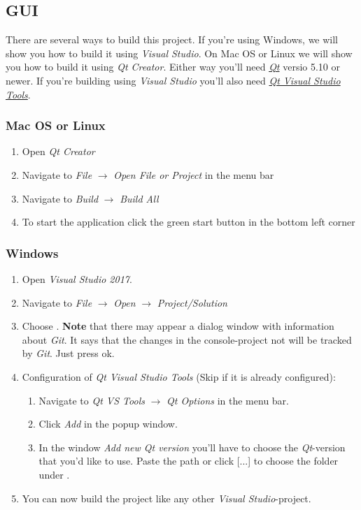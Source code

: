 \subsection{GUI} \label{GUI}
There are several ways to build this project. If you're using Windows, we will show you how to build it using \textit{Visual Studio}. On Mac OS or Linux we will show you how to build it using \textit{Qt Creator}. Either way you'll need \href{https://www.qt.io/download}{\textit{Qt}} versio 5.10 or newer. If you're building using \textit{Visual Studio} you'll also need \href{https://marketplace.visualstudio.com/items?itemName=TheQtCompany.QtVisualStudioTools-19123}{\textit{Qt Visual Studio Tools}}.

\subsubsection{Mac OS or Linux}
\begin{enumerate}
    \item Open \textit{Qt Creator}
    \item Navigate to \textit{File} \(\rightarrow\) \textit{Open File or Project} in the menu bar
    \item Navigate to \textit{Build} \(\rightarrow\) \textit{Build All}
    \item To start the application click the green start button in the bottom left corner
\end{enumerate}
\subsubsection{Windows}
\begin{enumerate}
    \item Open \textit{Visual Studio 2017}.
    \item Navigate to \textit{File} \(\rightarrow\) \textit{Open} \(\rightarrow\) \textit{Project/Solution}
    \item Choose . \textbf{Note} that there may appear a dialog window with information about \textit{Git}. It says that the changes in the console-project not will be tracked by \textit{Git}. Just press ok.
    \item Configuration of \textit{Qt Visual Studio Tools} (Skip if it is already configured):
        \begin{enumerate}
            \item Navigate to \textit{Qt VS Tools} \(\rightarrow\) \textit{Qt Options} in the menu bar. 
            \item Click \textit{Add} in the popup window. 
            \item In the window \textit{Add new Qt version} you'll have to choose the \textit{Qt}-version that you'd like to use. Paste the path or click [...] to choose the folder  under .
        \end{enumerate}
    \item You can now build the project like any other \textit{Visual Studio}-project.
\end{enumerate}